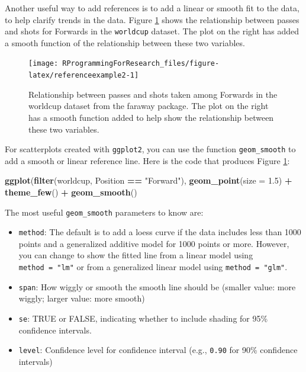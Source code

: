 \documentclass[]{book}
\makeatletter
\newenvironment{Shaded}{\begin{snugshade}}{\end{snugshade}}
\newcommand{\KeywordTok}[1]{\textcolor[rgb]{0.13,0.29,0.53}{\textbf{#1}}}
\newcommand{\DataTypeTok}[1]{\textcolor[rgb]{0.13,0.29,0.53}{#1}}
\newcommand{\FloatTok}[1]{\textcolor[rgb]{0.00,0.00,0.81}{#1}}
\newcommand{\StringTok}[1]{\textcolor[rgb]{0.31,0.60,0.02}{#1}}
\newcommand{\OperatorTok}[1]{\textcolor[rgb]{0.81,0.36,0.00}{\textbf{#1}}}
\newcommand{\NormalTok}[1]{#1}
\providecommand{\tightlist}{%
  \setlength{\itemsep}{0pt}\setlength{\parskip}{0pt}}
\newenvironment{kframe}{%
\medskip{}
\setlength{\fboxsep}{.8em}
 \def\at@end@of@kframe{}%
 \ifinner\ifhmode%
  \def\at@end@of@kframe{\end{minipage}}%
  \begin{minipage}{\columnwidth}%
 \fi\fi%
 \def\FrameCommand##1{\hskip\@totalleftmargin \hskip-\fboxsep
 \colorbox{shadecolor}{##1}\hskip-\fboxsep
     \hskip-\linewidth \hskip-\@totalleftmargin \hskip\columnwidth}%
 \MakeFramed {\advance\hsize-\width
   \@totalleftmargin\z@ \linewidth\hsize
   \@setminipage}}%
 {\par\unskip\endMakeFramed%
 \at@end@of@kframe}
\renewenvironment{Shaded}{\begin{kframe}}{\end{kframe}}
\theoremstyle{definition}
\theoremstyle{definition}
\theoremstyle{definition}
\theoremstyle{remark}
\makeatother
\begin{document}
Another useful way to add references is to add a linear or smooth fit to
the data, to help clarify trends in the data. Figure
\ref{fig:referenceexample2} shows the relationship between passes and
shots for Forwards in the \texttt{worldcup} dataset. The plot on the
right has added a smooth function of the relationship between these two
variables.

\begin{figure}

{\centering \texttt{[image: RProgrammingForResearch\_files/figure-latex/referenceexample2-1]} 

}

\caption{Relationship between passes and shots taken among Forwards in the worldcup dataset from the faraway package. The plot on the right has a smooth function added to help show the relationship between these two variables.}\label{fig:referenceexample2}
\end{figure}

For scatterplots created with \texttt{ggplot2}, you can use the function
\texttt{geom\_smooth} to add a smooth or linear reference line. Here is
the code that produces Figure \ref{fig:referenceexample2}:

\begin{Shaded}
\begin{Highlighting}[]
\KeywordTok{ggplot}\NormalTok{(}\KeywordTok{filter}\NormalTok{(worldcup, Position }\OperatorTok{==}\StringTok{ "Forward"}\NormalTok{),}
        \KeywordTok{geom_point}\NormalTok{(}\DataTypeTok{size =} \FloatTok{1.5}\NormalTok{) }\OperatorTok{+}\StringTok{ }
\StringTok{        }\KeywordTok{theme_few}\NormalTok{()  }\OperatorTok{+}\StringTok{ }
\StringTok{        }\KeywordTok{geom_smooth}\NormalTok{()}
\end{Highlighting}
\end{Shaded}

The most useful \texttt{geom\_smooth} parameters to know are:

\begin{itemize}
\tightlist
\item
  \texttt{method}: The default is to add a loess curve if the data
  includes less than 1000 points and a generalized additive model for
  1000 points or more. However, you can change to show the fitted line
  from a linear model using \texttt{method\ =\ "lm"} or from a
  generalized linear model using \texttt{method\ =\ "glm"}.
\item
  \texttt{span}: How wiggly or smooth the smooth line should be (smaller
  value: more wiggly; larger value: more smooth)
\item
  \texttt{se}: TRUE or FALSE, indicating whether to include shading for
  95\% confidence intervals.
\item
  \texttt{level}: Confidence level for confidence interval (e.g.,
  \texttt{0.90} for 90\% confidence intervals)
\end{itemize}
\end{document}
